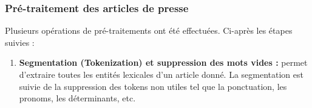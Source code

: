         \subsubsection{Pré-traitement des articles de presse}
         Plusieurs opérations de pré-traitements ont été effectuées. Ci-après les étapes suivies :
        \begin{enumerate}
            \item{\textbf{Segmentation (Tokenization) et suppression des mots vides :} }permet d'extraire toutes les entités lexicales d'un article donné. La segmentation est suivie de la suppression des tokens non utiles tel que la ponctuation, les pronoms, les déterminants, etc.\\ 
                          
                
                                       
                                                          
                
                                                               
                
                
                
                
                
                

\end{enumerate}

